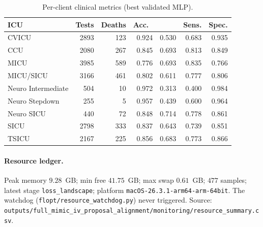 \begin{table}[h]
\centering
\caption{Per-client clinical metrics (best validated MLP).}
\label{tab:per-client-clinical-app}
\small
\begin{tabular}{lrrrrrr}
\toprule
ICU                  & Tests & Deaths & Acc.\ & \auprc{} & Sens. & Spec. \\
\midrule
CVICU                & 2893 & 123 & 0.924 & 0.530 & 0.683 & 0.935 \\
CCU                  & 2080 & 267 & 0.845 & 0.693 & 0.813 & 0.849 \\
MICU                 & 3985 & 589 & 0.776 & 0.693 & 0.835 & 0.766 \\
MICU/SICU            & 3166 & 461 & 0.802 & 0.611 & 0.777 & 0.806 \\
Neuro Intermediate   &  504 &  10 & 0.972 & 0.313 & 0.400 & 0.984 \\
Neuro Stepdown       &  255 &   5 & 0.957 & 0.439 & 0.600 & 0.964 \\
Neuro SICU           &  440 &  72 & 0.848 & 0.714 & 0.778 & 0.861 \\
SICU                 & 2798 & 333 & 0.837 & 0.643 & 0.739 & 0.851 \\
TSICU                & 2167 & 225 & 0.856 & 0.683 & 0.773 & 0.866 \\
\bottomrule
\end{tabular}
\end{table}

\paragraph{Resource ledger.} Peak memory $9.28$~GB; min free $41.75$~GB; max
swap $0.61$~GB; $477$ samples; latest stage \texttt{loss\_landscape}; platform
\texttt{macOS-26.3.1-arm64-arm-64bit}. The watchdog (\texttt{flopt/resource\_watchdog.py})
never triggered. Source:
\texttt{outputs/full\_mimic\_iv\_proposal\_alignment/monitoring/resource\_summary.csv}.
